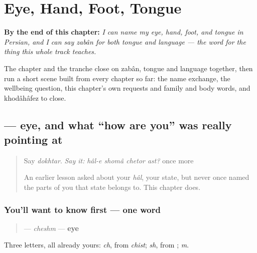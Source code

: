 
\chapter{Eye, Hand, Foot, Tongue}
\label{ch:fa-body}

\begin{chapteropening}
\textbf{By the end of this chapter:} \emph{I can name my eye, hand, foot, and tongue in Persian, and I can say zabân for both tongue and language — the word for the thing this whole track teaches.}

The chapter and the tranche close on zabân, tongue and language together, then run a short scene built from every chapter so far: the name exchange, the wellbeing question, this chapter's own requests and family and body words, and khodâhâfez to close.
\end{chapteropening}

\section[\texorpdfstring{\fa{چشم} (cheshm)}{چشم (cheshm)}]{ — eye, and what \textquotedblleft{}how are you\textquotedblright{} was really pointing at}

\label{lesson:FA-C11-cheshm}



\begin{quote}
Say \emph{dokhtar}. \emph{Say it:} \emph{hâl-e shomâ chetor ast?} once more

An earlier lesson asked about your \emph{hâl}, your state, but never once named the parts of you that state belongs to. This chapter does.
\end{quote}

\subsection*{You'll want to know first — one word}
\begin{quote}
\textbf{} — \emph{cheshm} — \textbf{eye}
\end{quote}

Three letters, all already yours: \textbf{} \emph{ch}, from \emph{chist}; \textbf{} \emph{sh}, from \textbf{}; \textbf{} \emph{m}.

